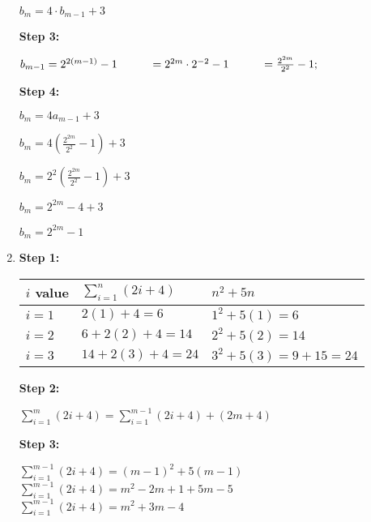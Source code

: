 \begin{enumerate}
            $b_{m} = 4 \cdot b_{m-1} + 3$
            
            \textbf{Step 3:}
            
            $ b_{m-1} = 2^{2(m-1)} - 1
            \hspace*{1cm} = 2^{2m} \cdot 2^{-2} - 1
            \hspace*{1cm} = \frac{ 2^{2m} }{2^{2}} - 1;$
            
            \textbf{Step 4:}
            
            $b_{m} = 4 a_{m-1} + 3$

            $b_{m} = 4 (\frac{2^{2m}}{2^{2}} - 1) + 3$

            $b_{m} = 2^{2}(\frac{2^{2m}}{2^{2}} - 1) + 3$

            $b_{m} = 2^{2m} - 4 + 3$

            $b_{m} = 2^{2m} - 1$

        \item
            \textbf{Step 1:}
            
                \begin{tabular}{l | p{4cm} | p{4cm} }
                    \textbf{ $i$ value } &
                    \textbf{ $ \sum_{i=1}^{n} (2i+4) $ } &
                    \textbf{ $n^{2} + 5n$ }
                    \\ \hline
                    $i = 1$ &
                        { $2(1)+4 = 6$ }{} &
                        { $1^{2} + 5(1) = 6$ }{} 

                    \\ 
                    $i = 2$ &
                        { $6 + 2(2)+4 = 14$ }{} &
                        { $2^{2} + 5(2) = 14$ }{} 

                    \\ 
                    $i = 3$ &
                        { $14 + 2(3) + 4 = 24$ }{} &
                        { $3^{2} + 5(3) = 9+15 = 24$ }{} 
                \end{tabular}
            
            \textbf{Step 2:}
            
                $ \sum_{i=1}^{m} (2i+4) = \sum_{i=1}^{m-1} (2i+4) + (2m+4)$

            \textbf{Step 3:}
            
                $ \sum_{i=1}^{m-1} (2i+4) = (m-1)^{2} + 5(m-1) $ ~\\
                $ \sum_{i=1}^{m-1} (2i+4) = m^{2} - 2m + 1 + 5m - 5 $ ~\\
                $ \sum_{i=1}^{m-1} (2i+4) = m^{2} + 3m - 4 $
                

\end{enumerate}
